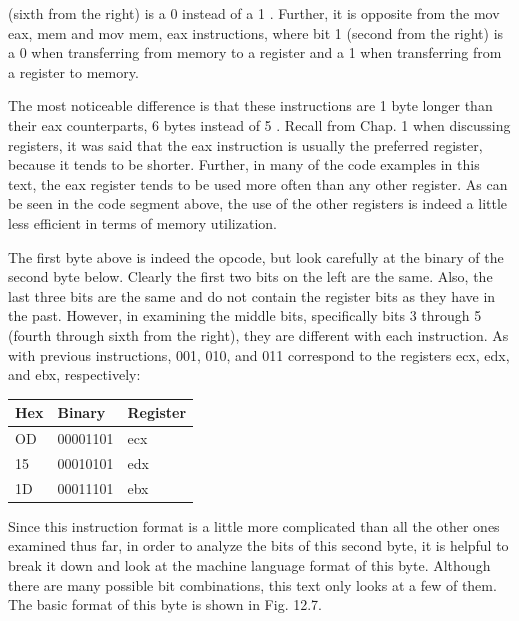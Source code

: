 \documentclass[10pt]{book}
\begin{document}
(sixth from the right) is a 0 instead of a 1 . Further, it is opposite from the mov eax, mem and mov mem, eax instructions, where bit 1 (second from the right) is a 0 when transferring from memory to a register and a 1 when transferring from a register to memory.

The most noticeable difference is that these instructions are 1 byte longer than their eax counterparts, 6 bytes instead of 5 . Recall from Chap. 1 when discussing registers, it was said that the eax instruction is usually the preferred register, because it tends to be shorter. Further, in many of the code examples in this text, the eax register tends to be used more often than any other register. As can be seen in the code segment above, the use of the other registers is indeed a little less efficient in terms of memory utilization.

The first byte above is indeed the opcode, but look carefully at the binary of the second byte below. Clearly the first two bits on the left are the same. Also, the last three bits are the same and do not contain the register bits as they have in the past. However, in examining the middle bits, specifically bits 3 through 5 (fourth through sixth from the right), they are different with each instruction. As with previous instructions, 001, 010, and 011 correspond to the registers ecx, edx, and ebx, respectively:

\begin{center}
\begin{tabular}{|l|l|l|}
\hline
Hex & Binary & Register \\
\hline
OD & 00001101 & ecx \\
\hline
15 & 00010101 & edx \\
\hline
1D & 00011101 & ebx \\
\hline
\end{tabular}
\end{center}

Since this instruction format is a little more complicated than all the other ones examined thus far, in order to analyze the bits of this second byte, it is helpful to break it down and look at the machine language format of this byte. Although there are many possible bit combinations, this text only looks at a few of them. The basic format of this byte is shown in Fig. 12.7.
\end{document}
